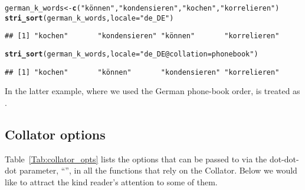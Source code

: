 \documentclass[nojss]{jss}\usepackage[]{graphicx}\usepackage[]{xcolor}
\makeatletter
\newcommand{\hlstr}[1]{\textcolor[rgb]{0.192,0.494,0.8}{#1}}%
\newcommand{\hlstd}[1]{\textcolor[rgb]{0.345,0.345,0.345}{#1}}%
\newcommand{\hlkwb}[1]{\textcolor[rgb]{0.69,0.353,0.396}{#1}}%
\newcommand{\hlkwc}[1]{\textcolor[rgb]{0.333,0.667,0.333}{#1}}%
\newcommand{\hlkwd}[1]{\textcolor[rgb]{0.737,0.353,0.396}{\textbf{#1}}}%
\newenvironment{kframe}{%
 \def\at@end@of@kframe{}%
 \ifinner\ifhmode%
  \def\at@end@of@kframe{\end{minipage}}%
  \begin{minipage}{\columnwidth}%
 \fi\fi%
 \def\FrameCommand##1{\hskip\@totalleftmargin \hskip-\fboxsep
 \colorbox{shadecolor}{##1}\hskip-\fboxsep
     \hskip-\linewidth \hskip-\@totalleftmargin \hskip\columnwidth}%
 \MakeFramed {\advance\hsize-\width
   \@totalleftmargin\z@ \linewidth\hsize
   \@setminipage}}%
 {\par\unskip\endMakeFramed%
 \at@end@of@kframe}
\newenvironment{knitrout}{}{} %
\makeatother
\begin{document}
\begin{knitrout}
\color{fgcolor}\begin{kframe}
\begin{alltt}
\hlstd{german_k_words} \hlkwb{<-} \hlkwd{c}\hlstd{(}\hlstr{"können"}\hlstd{,} \hlstr{"kondensieren"}\hlstd{,} \hlstr{"kochen"}\hlstd{,} \hlstr{"korrelieren"}\hlstd{)}
\hlkwd{stri_sort}\hlstd{(german_k_words,} \hlkwc{locale}\hlstd{=}\hlstr{"de_DE"}\hlstd{)}
\end{alltt}
\begin{verbatim}
## [1] "kochen"       "kondensieren" "können"       "korrelieren"
\end{verbatim}
\begin{alltt}
\hlkwd{stri_sort}\hlstd{(german_k_words,} \hlkwc{locale}\hlstd{=}\hlstr{"de_DE@collation=phonebook"}\hlstd{)}
\end{alltt}
\begin{verbatim}
## [1] "kochen"       "können"       "kondensieren" "korrelieren"
\end{verbatim}
\end{kframe}
\end{knitrout}


In the latter example, where we used the German phone-book order,
 is treated as .






\subsection{Collator options}\label{Sec:collator_opts}

Table~\ref{Tab:collator_opts} lists the options
that can be passed to  via the dot-dot-dot
parameter, ``'', in
all the functions that rely on the  Collator.
Below we would like to attract the kind reader's attention
to some of them.
\end{document}
